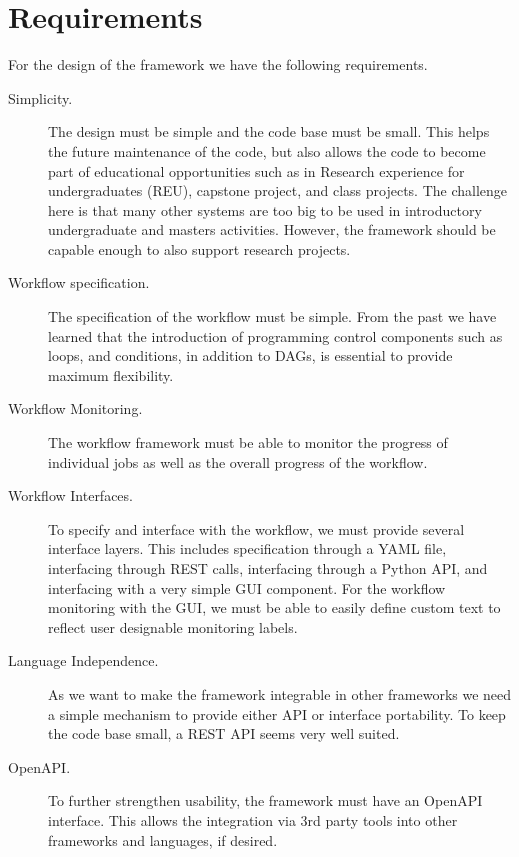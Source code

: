 
\section{Requirements}

For the design of the framework we have the following requirements.

\begin{description}

\item[Simplicity.] The design must be simple and the code base must be small. This helps the future maintenance of the code, but also allows the code to become part of educational opportunities such as in Research experience for undergraduates (REU), capstone project, and class projects. The challenge here is that many other systems are too big to be used in introductory undergraduate and masters activities.
However, the framework should be capable enough to also support research projects.

\item[Workflow specification.] The specification of the workflow must be simple. From the past we have learned that the introduction of programming control components such as loops, and conditions, in addition to DAGs, is essential to provide maximum flexibility.

\item[Workflow Monitoring.] The workflow framework must be able to monitor the progress of individual jobs as well as the overall progress of the workflow. 

\item[Workflow Interfaces.] To specify and interface with the workflow, we must provide several interface layers. This includes specification through a YAML file, interfacing through REST calls, interfacing through a Python API, and interfacing with a very simple GUI component. For the workflow monitoring with the GUI, we must be able to easily define custom text to reflect user designable monitoring labels.

\item[Language Independence.] As we want to make the framework integrable in other frameworks we need a simple mechanism to provide either API or interface portability. To keep the code base small, a REST API seems very well suited.

\item[OpenAPI.] To further strengthen usability, the framework must have an OpenAPI interface. This allows the integration via 3rd party tools into other frameworks and languages, if desired.


\end{description}
